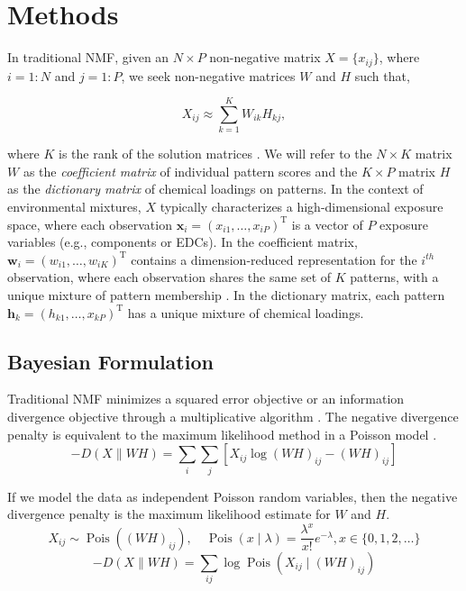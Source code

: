 \section{Methods}
\label{methods}
In traditional NMF, given an $N \times P$ non-negative matrix $X =\lbrace x_{i j}\rbrace $, where $i = 1:N$ and $j = 1:P$, we seek non-negative matrices $W$ and $H$ such that,

\begin{equation}
\label{nmf_trad}
X_{i j} \approx \sum^K_{k=1} W_{i k} H_{k j},
\end{equation}

where $K$ is the rank of the solution matrices \cite{lee1999learning}. We will refer to the $N \times K$ matrix $W$ as the \textit{coefficient matrix} of individual pattern scores and the $K \times P$ matrix $H$ as the \textit{dictionary matrix} of chemical loadings on patterns. In the context of environmental mixtures, $X$ typically characterizes a high-dimensional exposure space, where each observation $\mathbf{x}_{i}=\left(x_{i 1}, \ldots, x_{i P}\right)^{\mathrm{T}}$ is a vector of $P$ exposure variables (e.g., \PM components or EDCs). In the coefficient matrix, $\mathbf{w}_{i}=\left(w_{i 1}, \ldots, w_{i K}\right)^{\mathrm{T}}$ contains a dimension-reduced representation for the $i^{th}$ observation, where each observation  shares the same set of $K$ patterns, with a unique mixture of pattern membership \cite{wang2012nonnegative}. In the dictionary matrix, each pattern $\mathbf{h}_{k}=\left(h_{k 1}, \ldots, x_{k P}\right)^{\mathrm{T}}$ has a unique mixture of chemical loadings.

\subsection{Bayesian Formulation}
\label{methods_bayesian}
Traditional NMF minimizes a squared error objective or an information divergence objective through a multiplicative algorithm \cite{lee1999learning}. The negative divergence penalty is equivalent to the maximum likelihood method in a Poisson model \cite{cemgil2008bayesian,virtanen2008bayesian}.
\begin{equation}
-D(X \| W H)=\sum_{i} \sum_{j}\left[X_{i j} \log (W H)_{i j}-(W H)_{i j}\right]
\end{equation}

If we model the data as independent Poisson random variables, then the negative divergence penalty is the maximum likelihood estimate for $W$ and $H$.
\begin{equation*}
X_{i j} \sim \operatorname{Pois}\left((W H)_{i j}\right), \quad \operatorname{Pois}(x \mid \lambda)=\frac{\lambda^{x}}{x !} e^{-\lambda}, x \in\{0,1,2, \ldots\}
\end{equation*}
\vspace{-5ex}
\begin{equation}
-D(X \| W H) =\sum_{i j} \log \operatorname{Pois}\left(X_{i j} \mid(W H)_{i j}\right)
\end{equation}

